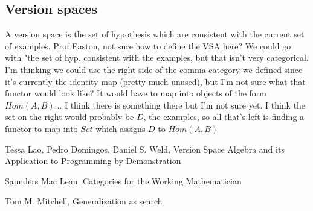 \documentclass{article}
\theoremstyle{definition}
\begin{document}
\subsection{Version spaces}
A version space is the set of hypothesis which are consistent with the current set of examples. Prof Easton, not sure how to define the VSA here? We could go with "the set of hyp. consistent with the examples, but that isn't very categorical. I'm thinking we could use the right side of the comma category we defined since it's currently the identity map (pretty much unused), but I'm not sure what that functor would look like? It would have to map into objects of the form $Hom(A,B)$... I think there is something there but I'm not sure yet. I think the set on the right would probably be $D$, the examples, so all that's left is finding a functor to map into $Set$ which assigns $D$ to $Hom(A,B)$


\begin{thebibliography}{9}
Tessa Lao, Pedro Domingos, Daniel S. Weld, Version Space Algebra and its Application to Programming by Demonstration

Saunders Mac Lean, Categories for the Working Mathematician

Tom M. Mitchell, Generalization as search
\end{thebibliography}
\end{document}
